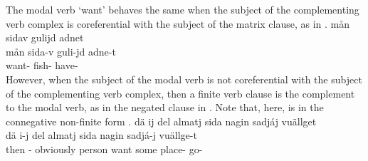 The modal verb  ‘want’ behaves the same when the subject of the complementing verb complex is coreferential with the subject of the matrix clause, as in .
\ea\label{modalVerbs4}%
\glll	mån sidav gulijd adnet\\
	mån sida-v guli-jd adne-t\\
	 want- fish- have-\\\nopagebreak
{} 
\z
However, when the subject of the modal verb  is not coreferential with the subject of the complementing verb complex, then a finite verb clause %
is the complement to the modal verb, as in the negated clause in . Note that, here,  is in the connegative non-finite form . %
\ea\label{modalVerbs5}%
\glll	dä ij del almatj sida nagin sadjáj vuällget\\
	dä i-j del almatj sida nagin sadjá-j vuällge-t\\
	then - obviously person\BS{} want\BS{} some place- go-\\\nopagebreak
{} 
\z

